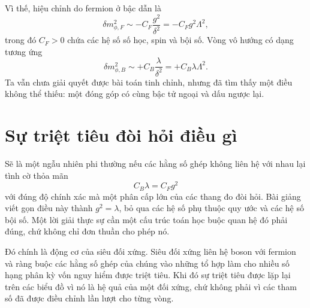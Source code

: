 \begin{classroomqa}
\end{classroomqa}

\begin{classroomqa}
\end{classroomqa}

Vì thế, hiệu chỉnh do fermion ở bậc dẫn là
\begin{equation}
\delta m_{\phi,F}^2
\sim -C_F\frac{g^2}{\delta^2}
=-C_Fg^2\Lambda^2,
\end{equation}
trong đó \(C_F>0\) chứa các hệ số số học, spin và bội số. Vòng vô hướng có dạng tương ứng
\begin{equation}
\delta m_{\phi,B}^2
\sim+C_B\frac{\lambda}{\delta^2}
=+C_B\lambda\Lambda^2.
\end{equation}
Ta vẫn chưa giải quyết được bài toán tinh chỉnh, nhưng đã tìm thấy một điều không thể thiếu: một đóng góp có cùng bậc tử ngoại và dấu ngược lại.

\section{Sự triệt tiêu đòi hỏi điều gì}

Sẽ là một ngẫu nhiên phi thường nếu các hằng số ghép không liên hệ với nhau lại tình cờ thỏa mãn
\begin{equation}
C_B\lambda=C_Fg^2
\end{equation}
với đúng độ chính xác mà một phân cấp lớn của các thang đo đòi hỏi. Bài giảng viết gọn điều này thành \(g^2=\lambda\), bỏ qua các hệ số phụ thuộc quy ước và các hệ số bội số. Một lời giải thực sự cần một cấu trúc toán học buộc quan hệ đó phải đúng, chứ không chỉ đơn thuần cho phép nó.

Đó chính là động cơ của siêu đối xứng. Siêu đối xứng liên hệ boson với fermion và ràng buộc các hằng số ghép của chúng vào những tổ hợp làm cho nhiều số hạng phân kỳ vốn nguy hiểm được triệt tiêu. Khi đó sự triệt tiêu được lặp lại trên các biểu đồ vì nó là hệ quả của một đối xứng, chứ không phải vì các tham số đã được điều chỉnh lần lượt cho từng vòng.

